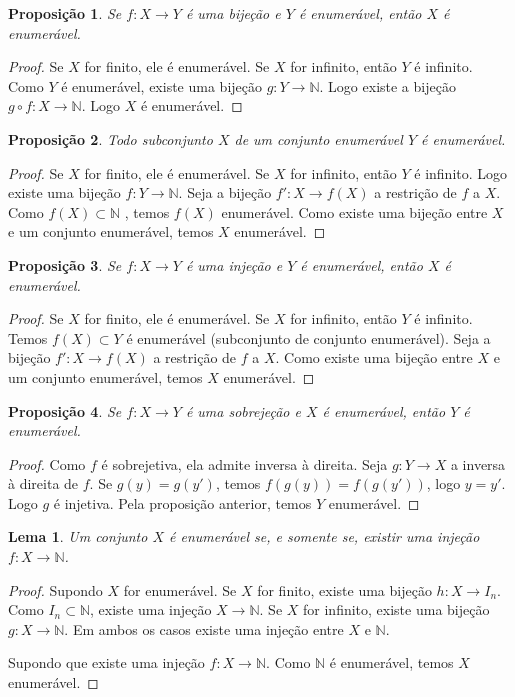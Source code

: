 \documentclass{article}
\theoremstyle{plain}
\newtheorem{prop}{Proposição}[section]
\newtheorem{lema}{Lema}
\theoremstyle{definition}
\theoremstyle{remark}
\begin{document}
\begin{prop}
	Se $f:X\to Y$ é uma bijeção e $Y$ é enumerável, então $X$ é enumerável.
\end{prop}
\begin{proof}
	Se $X$ for finito, ele é enumerável. Se $X$ for infinito,  então $Y$ é infinito.  Como $Y$ é enumerável,  existe uma bijeção $g: Y \to \mathbb{N}$. Logo existe a bijeção $g\circ f: X \to \mathbb{N}$. Logo $X$ é enumerável.
\end{proof}
\begin{prop}
	Todo subconjunto $X$ de um conjunto enumerável $Y$ é enumerável.
\end{prop}
\begin{proof}
	Se $X$ for finito, ele é enumerável. Se $X$ for infinito,  então $Y$ é infinito. Logo existe uma bijeção $f: Y \to \mathbb{N}$. Seja  a bijeção $f':X\to f(X)$ a restrição de $f$ a $X$. Como $f(X)\subset \mathbb{N}$ , temos $f(X)$ enumerável. Como existe uma bijeção entre $X$ e um conjunto enumerável, temos $X$  enumerável.
\end{proof}
\begin{prop}
	Se $f:X\to Y$ é uma injeção e $Y$ é enumerável, então $X$ é enumerável.
\end{prop}
\begin{proof}
	Se $X$ for finito, ele é enumerável. Se $X$ for infinito,  então $Y$ é infinito. Temos $f(X) \subset Y$ é enumerável (subconjunto de conjunto enumerável). Seja  a bijeção $f':X\to f(X)$ a restrição de $f$ a $X$. Como existe uma bijeção entre $X$ e um conjunto enumerável, temos $X$ enumerável.
\end{proof}
\begin{prop}
	Se $f:X\to Y$ é uma sobrejeção e $X$ é enumerável, então $Y$ é enumerável.
\end{prop}
\begin{proof}
	Como $f$ é sobrejetiva, ela admite inversa à direita. Seja $g: Y\to X$ a inversa à direita de $f$.  Se $g(y) = g(y')$, temos $f(g(y)) = f(g(y'))$, logo $y = y'$. Logo $g$ é injetiva. Pela proposição anterior, temos $Y$ enumerável. 
\end{proof}
\begin{lema}
	Um conjunto $X$ é enumerável se, e somente se, existir uma injeção $f: X \to \mathbb{N}$.
\end{lema}
\begin{proof}
	Supondo $X$ for enumerável. Se $X$ for finito, existe uma bijeção $h: X \to I_n$. Como $I_n \subset \mathbb{N}$,  existe uma injeção $X\to \mathbb{N}$. Se $X$ for infinito, existe uma bijeção $g: X \to \mathbb{N}$. Em ambos os casos existe uma injeção entre $X$ e $\mathbb{N}$.

	Supondo que existe uma injeção $f: X \to \mathbb{N}$. Como $\mathbb{N}$ é enumerável, temos $X$ enumerável.
\end{proof}
\end{document}
